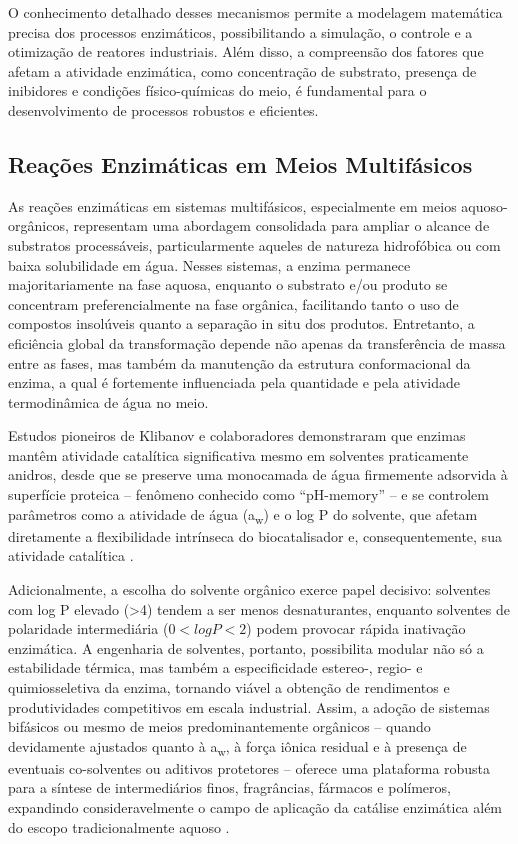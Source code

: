 \documentclass[12pt,oneside]{report}
\begin{document}
O conhecimento detalhado desses mecanismos permite a modelagem matemática precisa dos processos enzimáticos, possibilitando a simulação, o controle e a otimização de reatores industriais. Além disso, a compreensão dos fatores que afetam a atividade enzimática, como concentração de substrato, presença de inibidores e condições físico-químicas do meio, é fundamental para o desenvolvimento de processos robustos e eficientes.

\subsection{Reações Enzimáticas em Meios Multifásicos}

As reações enzimáticas em sistemas multifásicos, especialmente em meios aquoso-orgânicos, representam uma abordagem consolidada para ampliar o alcance de substratos processáveis, particularmente aqueles de natureza hidrofóbica ou com baixa solubilidade em água. Nesses sistemas, a enzima permanece majoritariamente na fase aquosa, enquanto o substrato e/ou produto se concentram preferencialmente na fase orgânica, facilitando tanto o uso de compostos insolúveis quanto a separação in situ dos produtos. Entretanto, a eficiência global da transformação depende não apenas da transferência de massa entre as fases, mas também da manutenção da estrutura conformacional da enzima, a qual é fortemente influenciada pela quantidade e pela atividade termodinâmica de água no meio.

Estudos pioneiros de Klibanov \cite{klibanov} e colaboradores demonstraram que enzimas mantêm atividade catalítica significativa mesmo em solventes praticamente anidros, desde que se preserve uma monocamada de água firmemente adsorvida à superfície proteica – fenômeno conhecido como “pH-memory” – e se controlem parâmetros como a atividade de água (a\textsubscript{w}) e o log P do solvente, que afetam diretamente a flexibilidade intrínseca do biocatalisador e, consequentemente, sua atividade catalítica \cite{klibanov}.

Adicionalmente, a escolha do solvente orgânico exerce papel decisivo: solventes com log P elevado (\textgreater 4) tendem a ser menos desnaturantes, enquanto solventes de polaridade intermediária ($0 < log P < 2$) podem provocar rápida inativação enzimática. A engenharia de solventes, portanto, possibilita modular não só a estabilidade térmica, mas também a especificidade estereo-, regio- e quimiosseletiva da enzima, tornando viável a obtenção de rendimentos e produtividades competitivos em escala industrial. Assim, a adoção de sistemas bifásicos ou mesmo de meios predominantemente orgânicos – quando devidamente ajustados quanto à a\textsubscript{w}, à força iônica residual e à presença de eventuais co-solventes ou aditivos protetores – oferece uma plataforma robusta para a síntese de intermediários finos, fragrâncias, fármacos e polímeros, expandindo consideravelmente o campo de aplicação da catálise enzimática além do escopo tradicionalmente aquoso \cite{klibanov}.
\end{document}
